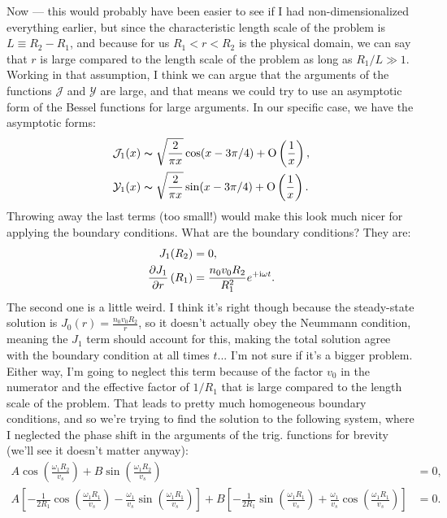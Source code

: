 \documentclass[12pt]{article}
\begin{document}
 	Now --- this would probably have been easier to see if I had non-dimensionalized everything earlier, but since the characteristic length scale of the problem is $L \equiv R_2 - R_1$, and because for us $R_1 < r < R_2$ is the physical domain, we can say that $r$ is large compared to the length scale of the problem as long as $R_1/L \gg 1$.  Working in that assumption, I think we can argue that the arguments of the functions $\mathcal{J}$ and $\mathcal{Y}$ are large, and that means we could try to use an asymptotic form of the Bessel functions for large arguments.  In our specific case, we have the asymptotic forms:
 	\begin{equation}
 	\begin{aligned}
 		\mathcal{J}_1(x) &\thicksim \sqrt{\frac{2}{\pi x}}\cos(x - 3\pi / 4) + \mathrm{O}\left( \frac{1}{x}\right), \\
 		\mathcal{Y}_1(x) &\thicksim \sqrt{\frac{2}{\pi x}}\sin(x - 3\pi / 4) + \mathrm{O}\left( \frac{1}{x}\right).
 	\end{aligned}
 	\end{equation}
 	Throwing away the last terms (too small!) would make this look much nicer for applying the boundary conditions.  What are the boundary conditions?  They are:
 	\begin{align*}
 	J_1(R_2) &= 0, \\
 	\pdv{J_1}{r} \left(R_1\right) &= \frac{n_0 v_0 R_2}{R_1^2}e^{+\mathrm{i}\omega t}.
 	\end{align*}
 	The second one is a little weird.  I think it's right though because the steady-state solution is $J_0(r) = \frac{n_0v_0R_2}{r}$, so it doesn't actually obey the Neummann condition, meaning the $J_1$ term should account for this, making the total solution agree with the boundary condition at all times $t$... I'm not sure if it's a bigger problem.  Either way, I'm going to neglect this term because of the factor $v_0$ in the numerator and the effective factor of $1 / R_1$ that is large compared to the length scale of the problem.  That leads to pretty much homogeneous boundary conditions, and so we're trying to find the solution to the following system, where I neglected the phase shift in the arguments of the trig. functions for brevity (we'll see it doesn't matter anyway): 
 	\begin{equation}
 	\begin{aligned}
 	A\cos\left( \frac{\omega_1R_2}{v_s}\right) + B \sin\left( \frac{\omega_1R_2}{v_s}\right) &= 0, \\
 	A\left[ -\frac{1}{2 R_1}\cos\left( \frac{\omega_1R_1}{v_s}\right) - \frac{\omega_1}{v_s}\sin\left( \frac{\omega_1R_1}{v_s}\right)\right] + B \left[-\frac{1}{2R_1}\sin\left( \frac{\omega_1R_1}{v_s}\right) + \frac{\omega_1}{v_s}\cos\left( \frac{\omega_1R_1}{v_s}\right) \right] &= 0.
 	\end{aligned}
 	\end{equation}
\end{document}
